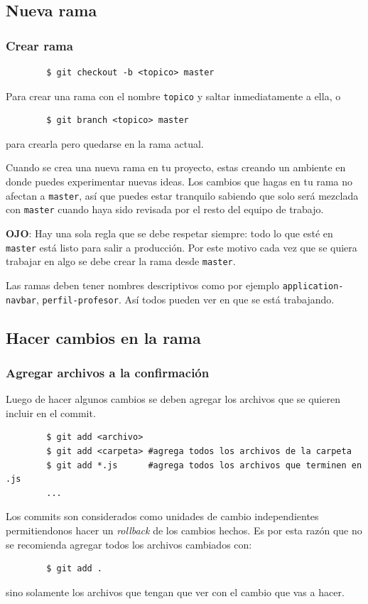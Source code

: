 \documentclass[10pt]{beamer}
\begin{document}
\subsection{Nueva rama}
\begin{frame}
	\frametitle{Crear rama}

	\begin{lstlisting}
		$ git checkout -b <topico> master
	\end{lstlisting}

	Para crear una rama con el nombre \texttt{topico} y saltar inmediatamente a 
	ella, o

	\begin{lstlisting}
		$ git branch <topico> master
	\end{lstlisting}

	para crearla pero quedarse en la rama actual.

	Cuando se crea una nueva rama en tu proyecto, estas creando un ambiente en 
	donde puedes experimentar nuevas ideas. Los cambios que hagas en tu rama no 
	afectan a \texttt{master}, así que puedes estar tranquilo sabiendo que solo 
	será mezclada con \texttt{master} cuando haya sido revisada por el resto 
	del equipo de trabajo.

	\textbf{OJO}: Hay una sola regla que se debe respetar siempre: todo lo que 
	esté en \texttt{master} está listo para salir a producción. Por este motivo 
	cada vez que se quiera trabajar en algo se debe crear la rama desde 
	\texttt{master}.

	Las ramas deben tener nombres descriptivos como por ejemplo 
	\texttt{application-navbar}, \texttt{perfil-profesor}. Así todos pueden ver 
	en que se está trabajando.
\end{frame} 

\subsection{Hacer cambios en la rama}
\begin{frame}[fragile]
	\frametitle{Agregar archivos a la confirmación}

	Luego de hacer algunos cambios se deben agregar los archivos que se quieren 
	incluir en el commit.

	\begin{lstlisting}
		$ git add <archivo>
		$ git add <carpeta> #agrega todos los archivos de la carpeta
		$ git add *.js      #agrega todos los archivos que terminen en .js
		...
	\end{lstlisting}

	Los commits son considerados como unidades de cambio independientes 
	permitiendonos hacer un \emph{rollback} de los cambios hechos. Es por esta 
	razón que no se recomienda agregar todos los archivos cambiados con:


	\begin{lstlisting}
		$ git add .
	\end{lstlisting}

	sino solamente los archivos que tengan que ver con el cambio que vas a 
	hacer.
\end{frame} 
\end{document}
